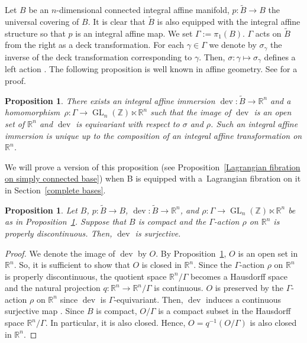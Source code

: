 \documentclass[10pt,a4paper]{amsart}
\numberwithin{equation}{section}
\newtheorem{Proposition}[Theorem]{Proposition}
 { \theoremstyle{definition}
\newtheorem{Definition}[Theorem]{Definition}
\newtheorem{Note}[Theorem]{Note}
\newtheorem{Example}[Theorem]{Example}
\newtheorem{Remark}[Theorem]{Remark} }
\newcommand{\R}{\mathbb{R}}
\newcommand{\Z}{\mathbb{Z}}
\renewcommand{\tilde}{\widetilde}
\def\dev{\operatorname{dev}}
\def\Aut{\operatorname{Aut}}
\def\Hom{\operatorname{Hom}}
\def\GL{\operatorname{GL}}
\begin{document}
Let $B$ be an $n$-dimensional connected integral affine manifold, $p\colon \tilde B\to B$ the universal covering of $B$. It is clear that $\tilde B$ is also equipped with the integral affine structure so that $p$ is an integral affine map. We set $\Gamma:=\pi_1(B)$. $\Gamma$ acts on $\tilde B$ from the right as a deck transformation. For each $\gamma \in \Gamma$ we denote by $\sigma_\gamma$ the inverse of the deck transformation corresponding to $\gamma$. Then, $\sigma\colon \gamma\mapsto \sigma_\gamma$ defines a left action \smash{$\sigma\in \Hom\bigl(\Gamma ,\Aut\bigl(\tilde B\bigr)\bigr)$}.
The following proposition is well known in affine geometry. See \cite[p.~641]{GH} for a proof.
\begin{Proposition}\label{developing map}
There exists an integral affine immersion $\dev\colon \tilde B\to \R^n$ and a homomorphism~${\rho\colon \Gamma\to \GL_n(\Z)\ltimes \R^n}$ such that the image of $\dev$ is an open set of $\R^n$ and $\dev$ is equivariant with respect to $\sigma$ and $\rho$. Such an integral affine immersion is unique up to the composition of an integral affine transformation on $\R^n$.
\end{Proposition}
We will prove a version of this proposition (see Proposition~\ref{Lagrangian fibration on simply connected base}) when B is equipped with a~Lagrangian fibration on it in Section~\ref{complete bases}.


\begin{Proposition}
Let $B$, $p\colon \tilde B\to B$, $\dev\colon \tilde B\to \R^n$, and $\rho\colon \Gamma\to \GL_n(\Z)\ltimes \R^n$ be as in Proposition~{\rm\ref{developing map}}. Suppose that $B$ is compact and the $\Gamma$-action $\rho$ on $\R^n$ is properly discontinuous. Then, $\dev$ is surjective.
\end{Proposition}
\begin{proof}
We denote the image of $\dev$ by $O$. By Proposition~\ref{developing map}, $O$ is an open set in $\R^n$. So, it is sufficient to show that $O$ is closed in $\R^n$. Since the $\Gamma$-action $\rho$ on $\R^n$ is properly discontinuous, the quotient space $\R^n /\Gamma$ becomes a Hausdorff space and the natural projection $q\colon \R^n\to \R^n/\Gamma$ is continuous. $O$ is preserved by the $\Gamma$-action $\rho$ on $\R^n$ since $\dev$ is $\Gamma$-equivariant. Then, $\dev$ induces a continuous surjective map \smash{${\overline \dev}\colon B={\tilde B}/\Gamma \to O/\Gamma$}. Since $B$ is compact, $O/\Gamma$ is a compact subset in the Hausdorff space $\R^n/\Gamma$. In particular, it is also closed. Hence, $O=q^{-1}\left( O/\Gamma\right)$ is also closed in $\R^n$.
\end{proof}
\end{document}
